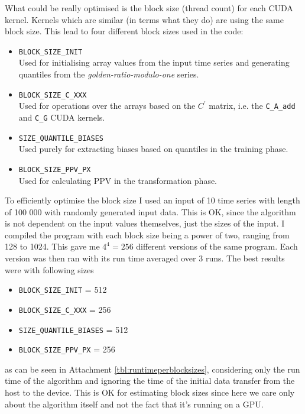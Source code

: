 \documentclass{article}
\begin{document}
What could be really optimised is the block size (thread count) for each CUDA kernel. Kernels which are similar (in terms what they do) are using the same block size. This lead to four different block sizes used in the code:\label{sec:blocksizes}
\begin{itemize}
    \item \texttt{BLOCK_SIZE_INIT}\\
        Used for initialising array values from the input time series and generating quantiles from the \emph{golden-ratio-modulo-one} series.
    \item \texttt{BLOCK_SIZE_C_XXX}\\
        Used for operations over the arrays based on the $C^\prime$ matrix, i.e. the \texttt{C_A_add} and \texttt{C_G} CUDA kernels.
    \item \texttt{SIZE_QUANTILE_BIASES}\\
        Used purely for extracting biases based on quantiles in the training phase.
    \item \texttt{BLOCK_SIZE_PPV_PX}\\
        Used for calculating PPV in the transformation phase.
\end{itemize}

To efficiently optimise the block size I used an input of 10 time series with length of 100 000 with randomly generated input data. This is OK, since the algorithm is not dependent on the input values themselves, just the sizes of the input. I compiled the program with each block size being a power of two, ranging from 128 to 1024. This gave me $4^4 = 256$ different versions of the same program. Each version was then ran with its run time averaged over 3 runs. The best results were with following sizes
\begin{itemize}
    \item \texttt{BLOCK_SIZE_INIT} = 512
    \item \texttt{BLOCK_SIZE_C_XXX} = 256
    \item \texttt{SIZE_QUANTILE_BIASES} = 512
    \item \texttt{BLOCK_SIZE_PPV_PX} = 256
\end{itemize}
as can be seen in Attachment \ref{tbl:runtimeperblocksizes}, considering only the run time of the algorithm and ignoring the time of the initial data transfer from the host to the device. This is OK for estimating block sizes since here we care only about the algorithm itself and not the fact that it's running on a GPU.
\end{document}
